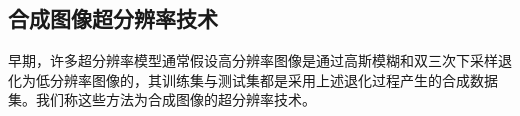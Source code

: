 

\subsection{合成图像超分辨率技术}
早期，许多超分辨率模型通常假设高分辨率图像是通过高斯模糊和双三次下采样退化为低分辨率图像的，其训练集与测试集都是采用上述退化过程产生的合成数据集。我们称这些方法为合成图像的超分辨率技术。
